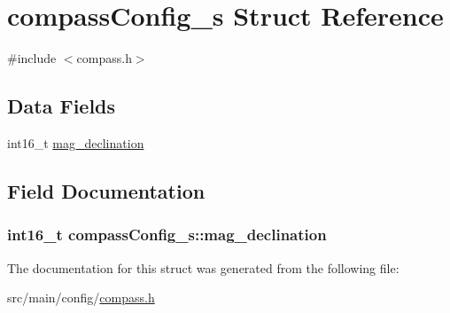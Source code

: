 \hypertarget{structcompassConfig__s}{\section{compass\+Config\+\_\+s Struct Reference}
\label{structcompassConfig__s}
}


{\ttfamily \#include $<$compass.\+h$>$}

\subsection*{Data Fields}
\begin{DoxyCompactItemize}
\item 
int16\+\_\+t \hyperlink{structcompassConfig__s_ad7e829d920e673b8c8fceb7e9bef3ef2}{mag\+\_\+declination}
\end{DoxyCompactItemize}


\subsection{Field Documentation}
\hypertarget{structcompassConfig__s_ad7e829d920e673b8c8fceb7e9bef3ef2}{
\subsubsection[{mag\+\_\+declination}]{\setlength{\rightskip}{0pt plus 5cm}int16\+\_\+t compass\+Config\+\_\+s\+::mag\+\_\+declination}}\label{structcompassConfig__s_ad7e829d920e673b8c8fceb7e9bef3ef2}


The documentation for this struct was generated from the following file\+:\begin{DoxyCompactItemize}
\item 
src/main/config/\hyperlink{config_2compass_8h}{compass.\+h}\end{DoxyCompactItemize}
